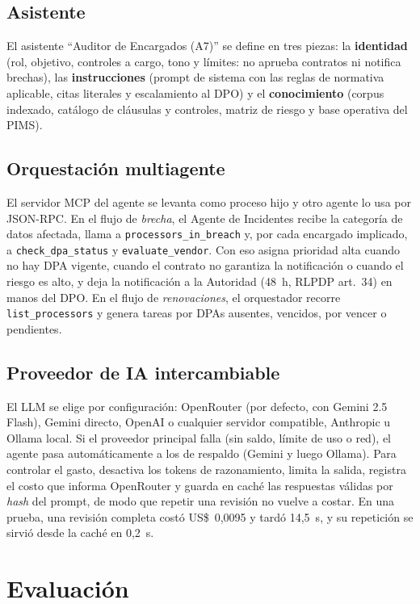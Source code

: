 \documentclass[conference]{IEEEtran}
\begin{document}
\subsection{Asistente}
El asistente ``Auditor de Encargados (A7)'' se define en tres piezas: la \textbf{identidad} (rol, objetivo, controles a cargo, tono y límites: no aprueba contratos ni notifica brechas), las \textbf{instrucciones} (prompt de sistema con las reglas de normativa aplicable, citas literales y escalamiento al DPO) y el \textbf{conocimiento} (corpus indexado, catálogo de cláusulas y controles, matriz de riesgo y base operativa del PIMS).

\subsection{Orquestación multiagente}
El servidor MCP del agente se levanta como proceso hijo y otro agente lo usa por JSON-RPC. En el flujo de \emph{brecha}, el Agente de Incidentes recibe la categoría de datos afectada, llama a \texttt{processors\_in\_breach} y, por cada encargado implicado, a \texttt{check\_dpa\_status} y \texttt{evaluate\_vendor}. Con eso asigna prioridad alta cuando no hay DPA vigente, cuando el contrato no garantiza la notificación o cuando el riesgo es alto, y deja la notificación a la Autoridad (48~h, RLPDP art.~34) en manos del DPO. En el flujo de \emph{renovaciones}, el orquestador recorre \texttt{list\_processors} y genera tareas por DPAs ausentes, vencidos, por vencer o pendientes.

\subsection{Proveedor de IA intercambiable}
El LLM se elige por configuración: OpenRouter (por defecto, con Gemini 2.5 Flash), Gemini directo, OpenAI o cualquier servidor compatible, Anthropic u Ollama local. Si el proveedor principal falla (sin saldo, límite de uso o red), el agente pasa automáticamente a los de respaldo (Gemini y luego Ollama). Para controlar el gasto, desactiva los tokens de razonamiento, limita la salida, registra el costo que informa OpenRouter y guarda en caché las respuestas válidas por \emph{hash} del prompt, de modo que repetir una revisión no vuelve a costar. En una prueba, una revisión completa costó US\$~0{,}0095 y tardó 14{,}5~s, y su repetición se sirvió desde la caché en 0{,}2~s.

\section{Evaluación}
\end{document}
